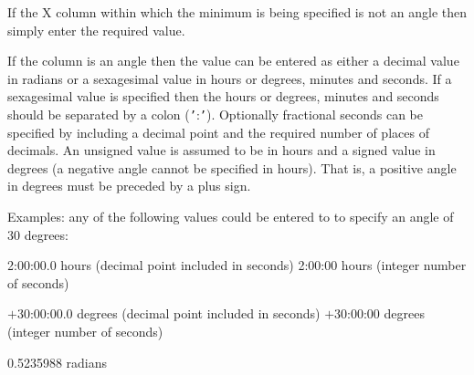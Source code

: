 \documentclass[twoside,11pt]{starlink}
\begin{document}
{{{         If the X column within which the minimum is being specified is
         not an angle then simply enter the required value.

         If the column is an angle then the value can be entered as
         either a decimal value in radians or a sexagesimal value in
         hours or degrees, minutes and seconds.  If a sexagesimal value
         is specified then the hours or degrees, minutes and seconds
         should be separated by a colon ({\tt '}:{\tt '}).  Optionally fractional
         seconds can be specified by including a decimal point and the
         required number of places of decimals.  An unsigned value is
         assumed to be in hours and a signed value in degrees (a
         negative angle cannot be specified in hours).  That is,
         a positive angle in degrees must be preceded by a plus sign.

         Examples: any of the following values could be entered to
         to specify an angle of 30 degrees:

             2:00:00.0   hours (decimal point included in seconds)
             2:00:00     hours (integer number of seconds)

           $+$30:00:00.0   degrees (decimal point included in seconds)
           $+$30:00:00     degrees (integer number of seconds)

             0.5235988   radians
      }
      }}
\end{document}
